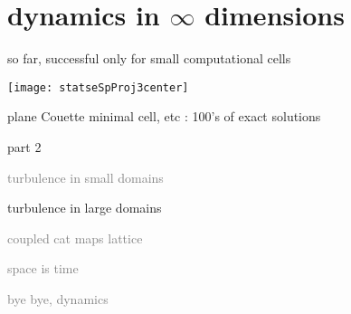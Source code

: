 \section[dynamics in $\infty$ dimensions]
{dynamics in $\infty$ dimensions}

%
%
%
%
%

%
%
%

\begin{frame}{so far, successful only for {\Huge small} computational cells}
\begin{center}
\texttt{[image: statseSpProj3center]}
\end{center}
plane Couette minimal cell, etc : 100's of exact solutions
\end{frame}

\begin{frame}{part 2}
\begin{enumerate}
              \item
    \textcolor{gray}{\small
turbulence in small domains
        }
              \item
    {\Large
turbulence in large domains
    }\textcolor{gray}{\small
              \item
coupled cat maps lattice
              \item
space is time
              \item
bye bye, dynamics
                    }
            \end{enumerate}
\end{frame}


